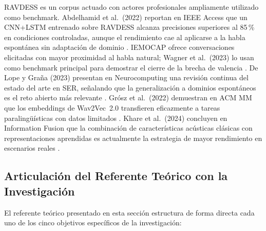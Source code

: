 RAVDESS es un corpus actuado con actores profesionales ampliamente utilizado como
benchmark. Abdelhamid et al.\ (2022) reportan en IEEE Access que un CNN+LSTM entrenado
sobre RAVDESS alcanza precisiones superiores al 85\,\% en condiciones controladas,
aunque el rendimiento cae al aplicarse a la habla espontánea sin adaptación de dominio
\cite{abdelhamid2022}. IEMOCAP ofrece conversaciones elicitadas con mayor proximidad
al habla natural; Wagner et al.\ (2023) lo usan como benchmark principal para demostrar
el cierre de la brecha de valencia \cite{wagner2023}. De Lope y Graña (2023) presentan
en Neurocomputing una revisión continua del estado del arte en SER, señalando que la
generalización a dominios espontáneos es el reto abierto más relevante \cite{delope2023}.
Grósz et al.\ (2022) demuestran en ACM MM que los embeddings de Wav2Vec~2.0 transfieren
eficazmente a tareas paralingüísticas con datos limitados \cite{grosz2022}. Khare et
al.\ (2024) concluyen en Information Fusion que la combinación de características
acústicas clásicas con representaciones aprendidas es actualmente la estrategia de
mayor rendimiento en escenarios reales \cite{khare2024}.

\subsection{Articulación del Referente Teórico con la Investigación}
\label{sec:rt_articulacion}

El referente teórico presentado en esta sección estructura de forma directa cada uno
de los cinco objetivos específicos de la investigación:

